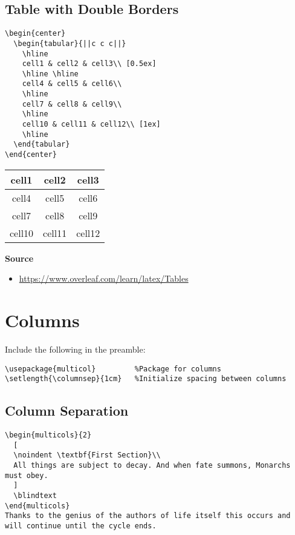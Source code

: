 \documentclass[10pt, letterpaper]{article}
\begin{document}
\subsection{Table with Double Borders}
\begin{multicols}{2}
\lstset{style=basicstyle}
\begin{lstlisting}[]
\begin{center}
  \begin{tabular}{||c c c||}
    \hline
    cell1 & cell2 & cell3\\ [0.5ex]
    \hline \hline
    cell4 & cell5 & cell6\\
    \hline
    cell7 & cell8 & cell9\\
    \hline
    cell10 & cell11 & cell12\\ [1ex]
    \hline
  \end{tabular}
\end{center}
\end{lstlisting}
\begin{center}
  \begin{tabular}{||c c c||}
    \hline
    cell1 & cell2 & cell3\\ [0.5ex]
    \hline \hline
    cell4 & cell5 & cell6\\
    \hline
    cell7 & cell8 & cell9\\
    \hline
    cell10 & cell11 & cell12\\ [1ex]
    \hline
  \end{tabular}
\end{center}
\end{multicols}

\noindent\textbf{Source}
\begin{itemize}
  \item \url{https://www.overleaf.com/learn/latex/Tables}
\end{itemize}


\section{Columns}
Include the following in the preamble:
\lstset{style=basicstyle}
\begin{lstlisting}[title=Preamble]
\usepackage{multicol}         %Package for columns
\setlength{\columnsep}{1cm}   %Initialize spacing between columns
\end{lstlisting}

\subsection{Column Separation}
\begin{lstlisting}[]
\begin{multicols}{2}
  [
  \noindent \textbf{First Section}\\
  All things are subject to decay. And when fate summons, Monarchs must obey.
  ]
  \blindtext
\end{multicols}
Thanks to the genius of the authors of life itself this occurs and will continue until the cycle ends.
\end{lstlisting}
\end{document}
